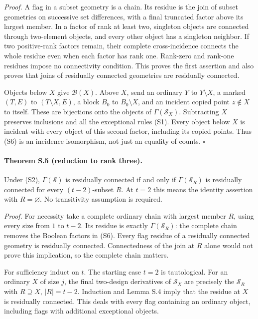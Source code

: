 \emph{Proof.}
A flag in a subset geometry is a chain. Its residue is the join of
subset geometries on successive set differences, with a final
truncated factor above its largest member. In a factor of rank at
least two, singleton objects are connected through two-element
objects, and every other object has a singleton neighbor. If two
positive-rank factors remain, their complete cross-incidence connects
the whole residue even when each factor has rank one. Rank-zero and
rank-one residues impose no connectivity condition. This proves the
first assertion and also proves that joins of residually connected
geometries are residually connected.

Objects below $X$ give $\mathcal B(X)$. Above $X$, send an ordinary
$Y$ to $Y\setminus X$, a marked $(T,E)$ to $(T\setminus X,E)$,
a block $B_0$ to $B_0\setminus X$, and an incident copied point
$z\notin X$ to itself. These are bijections onto the objects of
$\Gamma(\mathcal S_X)$. Subtracting $X$ preserves inclusions and
all the exceptional rules (S1). Every object below $X$ is incident
with every object of this second factor, including its copied points.
Thus (S6) is an incidence isomorphism, not just an equality of counts.
\hfill$\square$

\paragraph{Theorem S.5 (reduction to rank three).}
Under (S2), $\Gamma(\mathcal S)$ is residually connected if and
only if $\Gamma(\mathcal S_R)$ is residually connected for every
$(t-2)$-subset $R$. At $t=2$ this means the identity assertion with
$R=\varnothing$. No transitivity assumption is required.

\emph{Proof.}
For necessity take a complete ordinary chain with largest member
$R$, using every size from $1$ to $t-2$. Its residue is exactly
$\Gamma(\mathcal S_R)$: the complete chain removes the Boolean
factors in (S6). Every flag residue of a residually connected
geometry is residually connected. Connectedness of the join at $R$
alone would not prove this implication, so the complete chain matters.

For sufficiency induct on $t$. The starting case $t=2$ is tautological.
For an ordinary $X$ of size $j$, the final two-design derivatives of
$\mathcal S_X$ are precisely the $\mathcal S_R$ with
$R\supseteq X$, $|R|=t-2$. Induction and Lemma S.4 imply that the
residue at $X$ is residually connected. This deals with every flag
containing an ordinary object, including flags with additional
exceptional objects.

